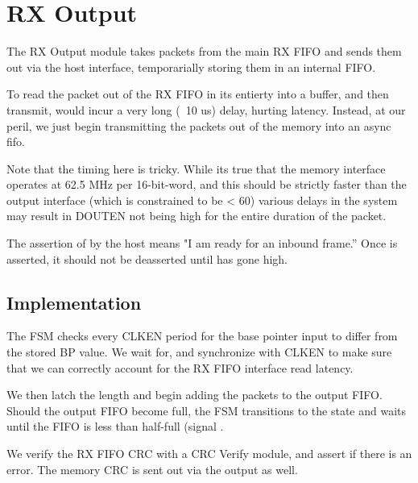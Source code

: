 \section{RX Output}

The RX Output module takes packets from the main RX FIFO and sends
them out via the host interface, temporarially storing them in an
internal FIFO.

To read the packet out of the RX FIFO in its entierty into a buffer,
and then transmit, would incur a very long (~10 us) delay, hurting
latency. Instead, at our peril, we just begin transmitting the packets
out of the memory into an async fifo.

Note that the timing here is tricky. While its true that the memory
interface operates at 62.5 MHz per 16-bit-word, and this should be
strictly faster than the output interface (which is constrained to be
< 60) various delays in the system may result in DOUTEN not being high
for the entire duration of the packet.

The assertion of  by the host means "I am ready for
an inbound frame.'' Once  is asserted, it should not
be deasserted until  has gone high.


\subsection{Implementation}
The FSM checks every CLKEN period for the base pointer input to differ
from the stored BP value. We wait for, and synchronize with CLKEN to
make sure that we can correctly account for the RX FIFO interface read
latency.


We then latch the length and begin adding the packets to the output
FIFO. Should the output FIFO become full, the FSM transitions to the
 state and waits until the FIFO is less than half-full
(signal .

We verify the RX FIFO CRC with a CRC Verify module, and assert
 if there is an error. The memory CRC is sent out
via the output as well. 

